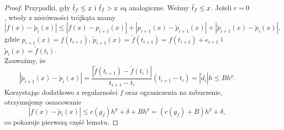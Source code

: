 \documentclass[oik, pdftex, robocza, man]{mgrwms}
\begin{document}
    \begin{proof}
        Przypadki, gdy $\hat{t}_{f} \leq x$ i $\hat{t}_{f} > x$ są analogiczne. Weźmy $\hat{t}_{f} \leq x$. Jeżeli $r=0$, wtedy z nierówności trójkąta mamy
        \begin{equation*}
            \left|f(x)-\tilde{p}_{i}(x)\right| \leq \left|f(x)-p_{i+1}(x)\right|+\left|p_{i+1}(x)-\tilde{p}_{i+1}(x)\right|+\left|\tilde{p}_{i+1}(x)-\tilde{p}_{i}(x)\right|,
        \end{equation*}
        gdzie $p_{i+1}(x) = f(t_{i+1})$, $\tilde{p}_{i+1}(x) = \tilde{f}(t_{i+1}) = f(t_{i+1}) + e_{i+1}$ i $\tilde{p}_{i}(x) = \tilde{f}(t_{i})$. \\
        Zauważmy, że
        \begin{equation*}
            \left|\tilde{p}_{i+1}(x)-\tilde{p}_{i}(x)\right| = \frac{|\tilde{f}(t_{i+1})-\tilde{f}(t_{i})|}{t_{i+1} - t_{i}} (t_{i+1} - t_{i}) = |\tilde{d}_{i}|h \leq Bh^{\varrho}.
        \end{equation*}
        Korzystając dodatkowo z regularności $f$ oraz ograniczenia na zaburzenie, otrzymujemy oszacowanie
        \begin{equation*}
            \left|f(x)-\tilde{p}_{i}(x)\right| \leq  c(g_{f}) h^{\varrho} + \delta + Bh^{\varrho} =  (c(g_{f}) + B)h^{\varrho} + \delta,
        \end{equation*}
        co pokazuje pierwszą część lematu.


\end{proof}
\end{document}
